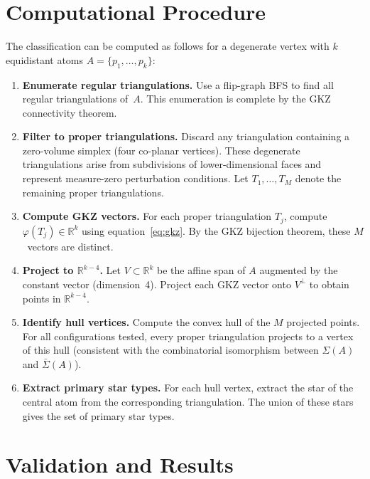 \documentclass[11pt]{article}
\newcommand{\R}{\mathbb{R}}
\theoremstyle{definition}
\begin{document}
\section{Computational Procedure}

The classification can be computed as follows for a degenerate vertex
with $k$ equidistant atoms $A = \{p_1, \ldots, p_k\}$:

\begin{enumerate}
\item \textbf{Enumerate regular triangulations.}
  Use a flip-graph BFS to find all regular triangulations of~$A$.
  This enumeration is complete by the GKZ connectivity theorem.

\item \textbf{Filter to proper triangulations.}
  Discard any triangulation containing a zero-volume simplex (four
  co-planar vertices).  These degenerate triangulations arise from
  subdivisions of lower-dimensional faces and represent measure-zero
  perturbation conditions.  Let $T_1, \ldots, T_M$ denote the
  remaining proper triangulations.

\item \textbf{Compute GKZ vectors.}
  For each proper triangulation $T_j$, compute $\varphi(T_j) \in \R^k$
  using equation~\eqref{eq:gkz}.  By the GKZ bijection theorem, these
  $M$~vectors are distinct.

\item \textbf{Project to $\R^{k-4}$.}
  Let $V \subset \R^k$ be the affine span of $A$ augmented by the
  constant vector (dimension~4).  Project each GKZ vector onto
  $V^\perp$ to obtain points in $\R^{k-4}$.

\item \textbf{Identify hull vertices.}
  Compute the convex hull of the $M$ projected points.  For all
  configurations tested, every proper triangulation projects to a vertex
  of this hull (consistent with the combinatorial isomorphism between
  $\Sigma(A)$ and $\bar\Sigma(A)$).

\item \textbf{Extract primary star types.}
  For each hull vertex, extract the star of the central atom from the
  corresponding triangulation.  The union of these stars gives the set
  of primary star types.
\end{enumerate}


\section{Validation and Results}
\end{document}
